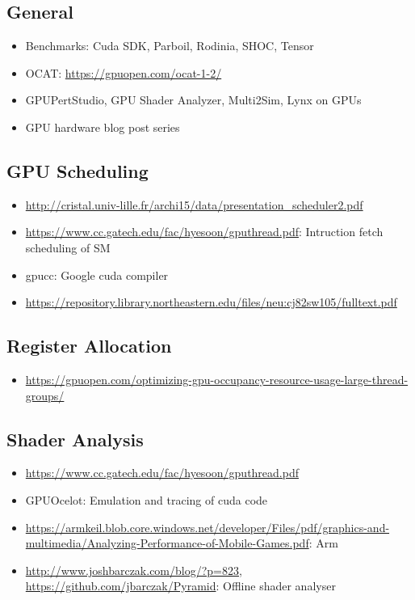 \clearpage
{}
\label{sec:references}

\subsection{General}
\begin{itemize}
	\item Benchmarks: Cuda SDK, Parboil, Rodinia, SHOC, Tensor
	\item OCAT: \url{https://gpuopen.com/ocat-1-2/}
	\item GPUPertStudio, GPU Shader Analyzer, Multi2Sim, Lynx on GPUs
	\item GPU hardware blog post series~\cite{Chajdas2018}
\end{itemize}

\subsection{GPU Scheduling}
\begin{itemize}
	\item \url{http://cristal.univ-lille.fr/archi15/data/presentation_scheduler2.pdf}
	\item \url{https://www.cc.gatech.edu/fac/hyesoon/gputhread.pdf}: Intruction fetch scheduling of SM
	\item gpucc: Google cuda compiler
	\item \url{https://repository.library.northeastern.edu/files/neu:cj82sw105/fulltext.pdf}
\end{itemize}

\subsection{Register Allocation}
\begin{itemize}
	\item \url{https://gpuopen.com/optimizing-gpu-occupancy-resource-usage-large-thread-groups/}
\end{itemize}

\subsection{Shader Analysis}
\begin{itemize}
	\item \url{https://www.cc.gatech.edu/fac/hyesoon/gputhread.pdf}
	\item GPUOcelot: Emulation and tracing of cuda code
	\item \url{https://armkeil.blob.core.windows.net/developer/Files/pdf/graphics-and-multimedia/Analyzing-Performance-of-Mobile-Games.pdf}: Arm
	\item \url{http://www.joshbarczak.com/blog/?p=823}, \url{https://github.com/jbarczak/Pyramid}: Offline shader analyser
\end{itemize}

